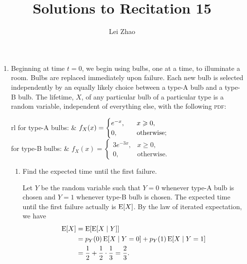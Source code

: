 

\title{Solutions to Recitation 15}
\author{Lei Zhao}



\maketitle

\begin{enumerate}
\item Beginning at time \(t = 0\), we begin using bulbs, one at a
  time, to illuminate a room.  Bulbs are replaced immediately upon
  failure.  Each new bulb is selected independently by an equally
  likely choice between a type-A bulb and a type-B bulb.  The
  lifetime, \(X\), of any particular bulb of a particular type is a
  random variable, independent of everything else, with the following
  \textsc{pdf}:
  \begin{center}
    \begin{tabular}{rl}
      for type-A bulbs:
      & \(f_X(x) =
        \begin{cases}
          \mathrlap{e^{-x},} \hphantom{3e^{-3x},} & x \geq 0, \\
          0,     & \text{otherwise;}
        \end{cases}\) \\[1.5em]
      for type-B bulbs:
      & \(f_X(x) =
        \begin{cases}
          3e^{-3x}, & x \geq 0, \\
          0,       & \text{otherwise.}
        \end{cases}\)
    \end{tabular}
  \end{center}

  \begin{enumerate} \parasp
  \item Find the expected time until the first failure.

    Let \(Y\) be the random variable such that \(Y=0\) whenever type-A
    bulb is chosen and \(Y=1\) whenever type-B bulb is chosen.  The
    expected time until the first failure actually is \(\operatorname{E}[X]\).  By
    the law of iterated expectation, we have
    \begin{align*}
      \operatorname{E}[X] &= \operatorname{E}[\operatorname{E}[X \mid Y]] \\
            &= p_Y(0) \operatorname{E}[X \mid Y=0] + p_Y(1) \operatorname{E}[X \mid Y=1] \\
            &= \frac12 + \frac12 \cdot \frac13 = \frac23.
    \end{align*}


\end{enumerate}
\end{enumerate}
